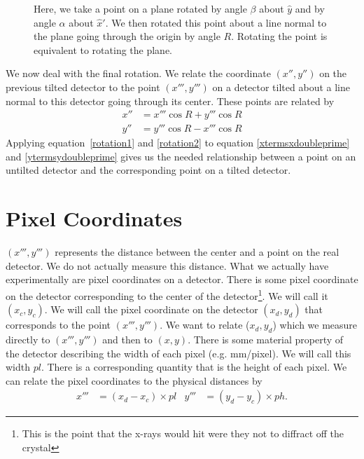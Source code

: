 \begin{SCfigure}[1][htbp]
    \centering
    
    \caption{Here, we take a point on a plane rotated
    by angle $\beta$ about $\hat y$ and by angle
    $\alpha$ about $\hat x'$. We then rotated this point
    about a line normal to the plane going through the
    origin by angle $R$. Rotating the point is 
    equivalent to rotating the plane.}
    \label{RotationFormula}
\end{SCfigure}

We now deal with the final rotation. We relate
the coordinate $(x'',y'')$ on the previous tilted 
detector to the point $(x''',y''')$ on a detector 
tilted about a line normal to this detector going 
through its center. These points are related by
\begin{align}
    x''&=x'''\cos R + y'''\cos R\label{rotation1}\\
    y''&=y'''\cos R - x'''\cos R\label{rotation2}
\end{align}
Applying equation~\ref{rotation1} and \ref{rotation2}
to equation \ref{xtermsxdoubleprime} and \ref{ytermsydoubleprime}
gives us the needed relationship between a point on an untilted
detector and the corresponding point on a tilted detector.

\section{Pixel Coordinates}

$(x''',y''')$ represents the distance between the center 
and a point on the real detector. We do not actually
measure this distance. What we actually have experimentally
are pixel coordinates on a detector. There is some pixel 
coordinate on the detector corresponding to the center of
the detector\footnote{This is the point that the x-rays would
hit were they not to diffract off the crystal}. We will call 
it $(x_c,y_c)$.  We will call the pixel coordinate on the detector
$(x_d,y_d)$ that corresponds to the point $(x''',y''')$.
We want to relate ($x_d,y_d$) which we measure directly
to $(x''',y''')$ and then to $(x,y)$.
There is some material property of the detector 
describing the width of each pixel
(e.g. \unit[1000]{mm/pixel}). We will call
this width $pl$. There is a corresponding
quantity that is the height of each pixel.
We can relate the pixel coordinates to the physical distances
by
\begin{align}\label{conversionToPixels}
    x'''&=(x_d-x_c) \times pl &
    y'''&=(y_d-y_c) \times ph.
\end{align}

